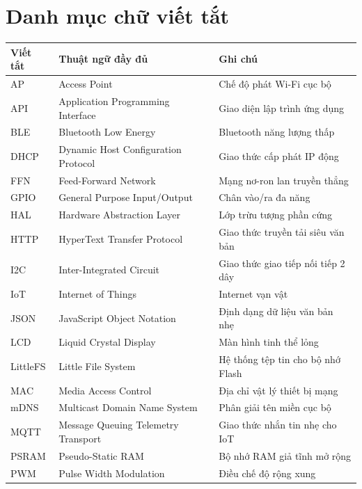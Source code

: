 \section*{Danh mục chữ viết tắt}

\begin{table}[H]
\centering
\begin{tabular}{lll}
\toprule
\textbf{Viết tắt} & \textbf{Thuật ngữ đầy đủ} & \textbf{Ghi chú} \\
\midrule
AP      & Access Point                        & Chế độ phát Wi-Fi cục bộ \\
API     & Application Programming Interface  & Giao diện lập trình ứng dụng \\
BLE     & Bluetooth Low Energy                & Bluetooth năng lượng thấp \\
DHCP    & Dynamic Host Configuration Protocol & Giao thức cấp phát IP động \\
FFN     & Feed-Forward Network                & Mạng nơ-ron lan truyền thẳng \\
GPIO    & General Purpose Input/Output        & Chân vào/ra đa năng \\
HAL     & Hardware Abstraction Layer          & Lớp trừu tượng phần cứng \\
HTTP    & HyperText Transfer Protocol         & Giao thức truyền tải siêu văn bản \\
I2C     & Inter-Integrated Circuit            & Giao thức giao tiếp nối tiếp 2 dây \\
IoT     & Internet of Things                  & Internet vạn vật \\
JSON    & JavaScript Object Notation          & Định dạng dữ liệu văn bản nhẹ \\
LCD     & Liquid Crystal Display              & Màn hình tinh thể lỏng \\
LittleFS & Little File System                 & Hệ thống tệp tin cho bộ nhớ Flash \\
MAC     & Media Access Control                & Địa chỉ vật lý thiết bị mạng \\
mDNS    & Multicast Domain Name System        & Phân giải tên miền cục bộ \\
MQTT    & Message Queuing Telemetry Transport & Giao thức nhắn tin nhẹ cho IoT \\
PSRAM   & Pseudo-Static RAM                   & Bộ nhớ RAM giả tĩnh mở rộng \\
PWM     & Pulse Width Modulation              & Điều chế độ rộng xung \\

\end{tabular}
\end{table}
